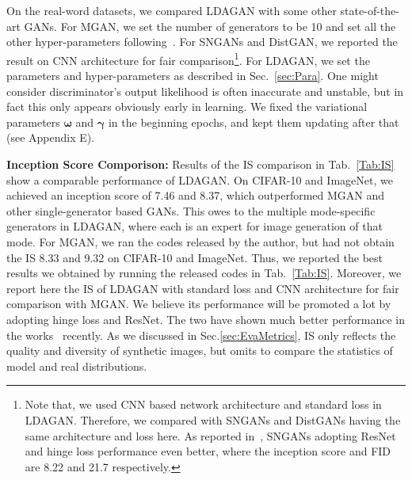 \documentclass{article}
\begin{document}
On the real-word datasets, we compared LDAGAN with some other state-of-the-art GANs.
For MGAN, we set the number of generators to be 10 and set all the other hyper-parameters following~\cite{hoang2018mgan}.
For SNGANs and DistGAN, we reported the result on CNN architecture for fair comparison\footnote[1]{Note that, we used CNN based network architecture and standard loss in LDAGAN. Therefore, we compared with SNGANs and DistGANs having the same architecture and loss here. As reported in~\cite{miyato2018spectral}, SNGANs adopting ResNet and hinge loss performance even better, where the inception score and FID are 8.22 and 21.7 respectively.}.
For LDAGAN, we set the parameters and hyper-parameters as described in Sec.~\ref{sec:Para}.
One might consider discriminator's output likelihood is often inaccurate and unstable, but in fact this only appears obviously early in learning.
We fixed the variational parameters $\bm{\omega}$ and $\bm{\gamma}$ in the beginning epochs, and kept them updating after that (see Appendix E).

\noindent\textbf{Inception Score Comporison:} Results of the IS comparison in Tab.~\ref{Tab:IS} show a comparable performance of LDAGAN.
On CIFAR-10 and ImageNet, we achieved an inception score of 7.46 and 8.37, which outperformed MGAN and other single-generator based GANs.
This owes to the multiple mode-specific generators in LDAGAN, where each is an expert for image generation of that mode.
For MGAN, we ran the codes released by the author, but had not obtain the IS 8.33 and 9.32 on CIFAR-10 and ImageNet.
Thus, we reported the best results we obtained by running the released codes in Tab.~\ref{Tab:IS}.
Moreover, we report here the IS of LDAGAN with standard loss and CNN architecture for fair comparison with MGAN.
We believe its performance will be promoted a lot by adopting hinge loss and ResNet.
The two have shown much better performance in the works~\cite{tran2018dist,miyato2018spectral} recently.
As we discussed in Sec.\ref{sec:EvaMetrics}, IS only reflects the quality and diversity of synthetic images, but omits to compare the statistics of model and real distributions.
\end{document}
